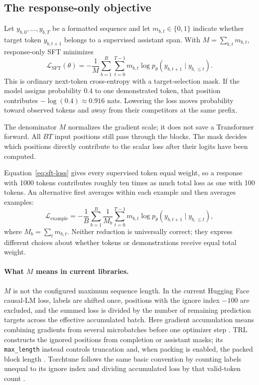 \subsection{The response-only objective}

Let $y_{b,0},\ldots,y_{b,T}$ be a formatted sequence and let
$m_{b,t}\in\{0,1\}$ indicate whether target token $y_{b,t+1}$ belongs to a supervised
assistant span. With $M=\sum_{b,t}m_{b,t}$, response-only SFT minimizes
\begin{equation}
  \mathcal{L}_{\mathrm{SFT}}(\theta)
  =-\frac{1}{M}\sum_{b=1}^{B}\sum_{t=0}^{T-1}
    m_{b,t}\log p_\theta(y_{b,t+1}\mid y_{b,\leq t}).
  \label{eq:sft-loss}
\end{equation}
This is ordinary next-token cross-entropy with a target-selection mask. If the model
assigns probability $0.4$ to one demonstrated token, that position contributes
$-\log(0.4)\approx0.916$ nats. Lowering the loss moves probability toward observed
tokens and away from their competitors at the same prefix.

The denominator $M$ normalizes the gradient scale; it does not save a Transformer
forward. All $BT$ input positions still pass through the blocks. The mask decides which
positions directly contribute to the scalar loss after their logits have been computed.

Equation~\ref{eq:sft-loss} gives every supervised token equal weight, so a response with
1000 tokens contributes roughly ten times as much total loss as one with 100 tokens. An
alternative first averages within each example and then averages examples:
\begin{equation}
  \mathcal{L}_{\mathrm{example}}
  =-\frac{1}{B}\sum_{b=1}^{B}\frac{1}{M_b}
    \sum_{t=0}^{T-1}m_{b,t}
    \log p_\theta(y_{b,t+1}\mid y_{b,\leq t}),
\end{equation}
where $M_b=\sum_t m_{b,t}$. Neither reduction is universally correct; they express
different choices about whether tokens or demonstrations receive equal total weight.

\paragraph{What $M$ means in current libraries.}
$M$ is not the configured maximum sequence length. In the current Hugging Face causal-LM
loss, labels are shifted once, positions with the ignore index $-100$ are excluded, and
the summed loss is divided by the number of remaining prediction targets across the
effective accumulated batch. Here gradient accumulation means combining gradients from
several microbatches before one optimizer step \citep{huggingface2026gradientaccumulation,
huggingface2026transformersloss}. TRL constructs the ignored positions from completion or
assistant masks; its \texttt{max\_length} instead controls truncation and, when packing is
enabled, the packed block length \citep{huggingface2026trlsft}. Torchtune follows the same
basic convention by counting labels unequal to its ignore index and dividing accumulated
loss by that valid-token count \citep{pytorch2026torchtuneloss}.

